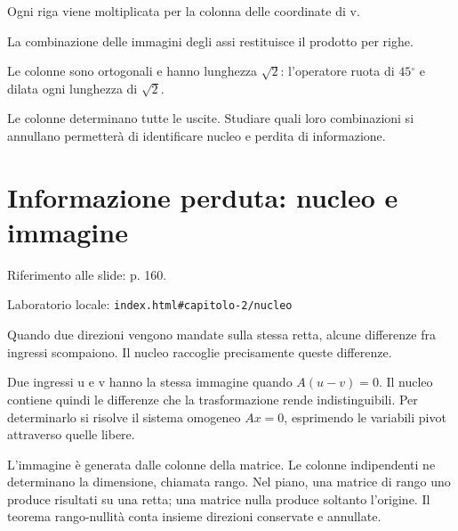 Ogni riga viene moltiplicata per la colonna delle coordinate di v.\par


\label{c2-matrici-example-2-step-4}


La combinazione delle immagini degli assi restituisce il prodotto per righe.\par



Le colonne sono ortogonali e hanno lunghezza \(\sqrt{2}\): l'operatore ruota di \(45{}^{\circ} \) e dilata ogni lunghezza di \(\sqrt{2}\).\par


Le colonne determinano tutte le uscite. Studiare quali loro combinazioni si annullano permetterà di identificare nucleo e perdita di informazione.\par


\Needspace{.43\textheight}
\section{Informazione perduta: nucleo e immagine}
\label{c2-nucleo}

{\sffamily\small\color{Ink!70} Riferimento alle slide: p. 160.\par}

{\sffamily\small\color{Ink!70} Laboratorio locale: \nolinkurl{index.html#capitolo-2/nucleo}\par}

Quando due direzioni vengono mandate sulla stessa retta, alcune differenze fra ingressi scompaiono. Il nucleo raccoglie precisamente queste differenze.\par

Due ingressi u e v hanno la stessa immagine quando \(A(u- v)=0\). Il nucleo contiene quindi le differenze che la trasformazione rende indistinguibili. Per determinarlo si risolve il sistema omogeneo \(Ax=0\), esprimendo le variabili pivot attraverso quelle libere.\par

L'immagine è generata dalle colonne della matrice. Le colonne indipendenti ne determinano la dimensione, chiamata rango. Nel piano, una matrice di rango uno produce risultati su una retta; una matrice nulla produce soltanto l'origine. Il teorema rango-nullità conta insieme direzioni conservate e annullate.\par


